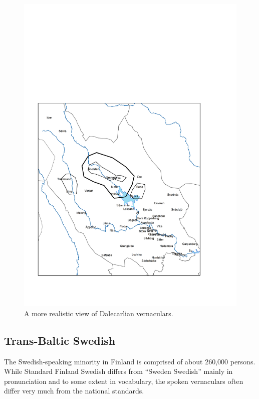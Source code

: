 \begin{figure}[h]

\includegraphics[height=.3\textheight]{figures/8_DalarnaRealistic}
\caption{A more realistic view of Dalecarlian vernaculars.}
\label{map:7}

\end{figure}

\subsection{ Trans-Baltic Swedish}

The Swedish-speaking minority in Finland is comprised of about 260,000 persons. While Standard Finland Swedish differs from “Sweden Swedish” mainly in pronunciation and to some extent in vocabulary, the spoken vernaculars often differ very much from the national standards. 

